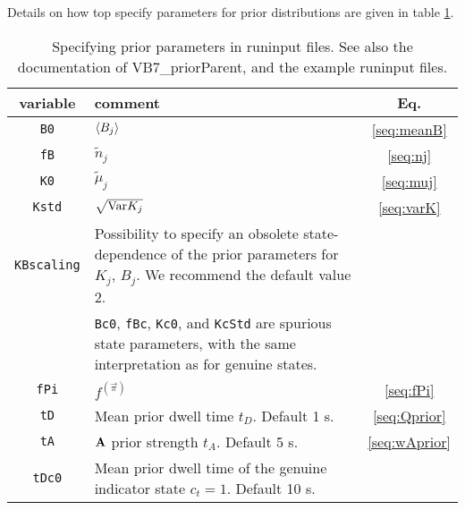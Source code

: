 Details on how top specify parameters for prior distributions are
given in table \ref{stab:priors}.

\begin{table}
  \begin{center}
    \begin{tabular}{|c|l|c|}
      \hline
      variable & comment & Eq.\\    
      \hline
      \hline
      \verb+B0+ & $\left\langle B_j\right\rangle$ & \eqref{seq:meanB}\\
      \verb+fB+ & $\tilde n_j$ &   \eqref{seq:nj}\\
      \verb+K0+ & $\tilde\mu_j$ &  \eqref{seq:muj}\\
      \verb+Kstd+& $\sqrt{\text{Var}{K_j}}$ & \eqref{seq:varK}\\
      \verb+KBscaling+& 
      \begin{minipage}[t]{0.5\columnwidth}
        Possibility to specify an obsolete state-dependence of the prior
        parameters for $K_j$, $B_j$. We recommend the default value 2.
      \end{minipage}&\\
      \hline
      &\begin{minipage}[t]{0.5\columnwidth}
         \verb+Bc0+, \verb+fBc+, \verb+Kc0+, and \verb+KcStd+ are
         spurious state parameters, with the same interpretation as for
         genuine states. 
       \end{minipage}&\\
      \hline
      \verb+fPi+& $f^{(\vec\pi)}$ & \eqref{seq:fPi}\\
      \verb+tD+ & \begin{minipage}[t]{0.5\columnwidth}
        Mean prior dwell time $t_D$. Default 1 s.  \end{minipage}& \eqref{seq:Qprior}\\
      \verb+tA+ & \begin{minipage}[t]{0.5\columnwidth}
        $\mathbf{A}$ prior strength $t_A$. Default 5 s. \end{minipage}& \eqref{seq:wAprior}\\
      \hline
      \verb+tDc0+ & 
      \begin{minipage}[t]{0.5\columnwidth}
        Mean prior dwell time of the genuine indicator state
        $c_t=1$. Default 10 s. \end{minipage}&\\
      \hline
    \end{tabular}
  \end{center}
  \caption{Specifying prior parameters in runinput files. See also the
    documentation of VB7\_priorParent, and the example runinput
    files.}\label{stab:priors}  
\end{table}
